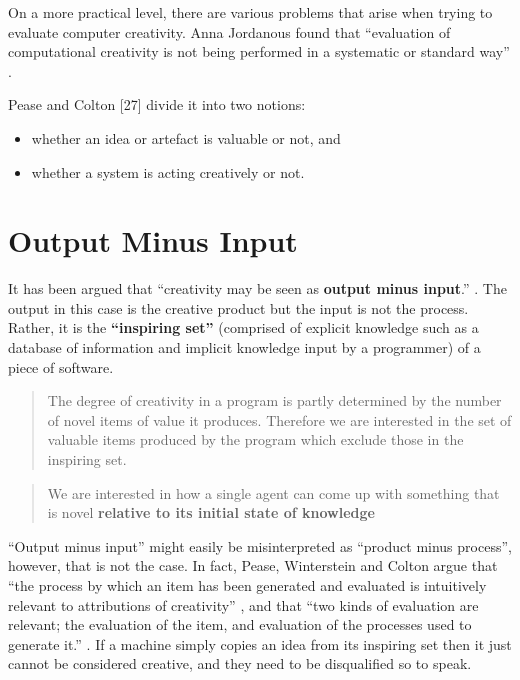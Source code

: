 On a more practical level, there are various problems that arise when trying to evaluate computer creativity. Anna Jordanous found that ``evaluation of computational creativity is not being performed in a systematic or standard way'' \parencite[p.2, her emphasis]{Jordanous2011}.

Pease and Colton [27] divide it into two notions: 

\begin{itemize}
  \item whether an idea or artefact is valuable or not, and
  \item whether a system is acting creatively or not.
\end{itemize}


\section{Output Minus Input}

It has been argued that ``creativity may be seen as \textbf{output minus input}.'' \parencite[p.2, my emphasis]{Pease2001}. The output in this case is the creative product but the input is not the process. Rather, it is the \textbf{``inspiring set''} (comprised of explicit knowledge such as a database of information and implicit knowledge input by a programmer) of a piece of software.

\begin{quote}
  The degree of creativity in a program is partly determined by the number of novel items of value it produces. Therefore we are interested in the set of valuable items produced by the program which exclude those in the inspiring set. \parencite[p.3]{Colton2001}
\end{quote}

\begin{quote}
  We are interested in how a single agent can come up with something that is novel \textbf{relative to its initial state of knowledge} \parencite[p.72, his emphasis]{Ritchie2007}
\end{quote}

``Output minus input'' might easily be misinterpreted as ``product minus process'', however, that is not the case. In fact, Pease, Winterstein and Colton argue that ``the process by which an item has been generated and evaluated is intuitively relevant to attributions of creativity'' \citeyear[p.6]{Pease2001}, and that ``two kinds of evaluation are relevant; the evaluation of the item, and evaluation of the processes used to generate it.'' \citeyear[p.7]{Pease2001}. If a machine simply copies an idea from its inspiring set then it just cannot be considered creative, and they need to be disqualified so to speak.


